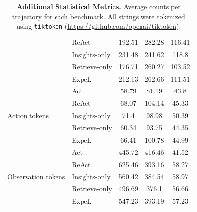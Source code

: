 \documentclass[letterpaper]{article} %
\begin{document}
\begin{table}[!ht]
\begin{tabular}{@{}llccc@{}}
		& ReAct & 192.51& 282.28& 116.41\\
		& Insights-only & 231.48& 241.62& 118.8\\
		& Retrieve-only & 176.71& 260.27& 103.52\\
		& ExpeL & 212.13& 262.66& 111.51\\
        \midrule
        \multirow{5}{*}{Action tokens} 
		& Act & 58.79& 81.19& 43.8\\
		& ReAct & 68.07& 104.14& 45.33\\
		& Insights-only & 71.4& 98.98& 50.39\\
		& Retrieve-only & 60.34& 93.75& 44.35\\
		& ExpeL & 66.41& 100.78& 44.99\\
        \midrule
        \multirow{5}{*}{Observation tokens} 
		& Act & 445.72& 416.46& 41.52\\
		& ReAct & 625.46& 393.16& 58.27\\
		& Insights-only & 560.42& 384.54& 58.97\\
		& Retrieve-only & 496.69& 376.1& 56.66\\
		& ExpeL & 547.23& 393.19& 57.23\\
        \midrule
    \end{tabular}
    \bigskip
    \caption{\textbf{Additional Statistical Metrics.} Average counts per trajectory for each benchmark. All strings were tokenized using \texttt{tiktoken} (\url{https://github.com/openai/tiktoken}).}
    \label{tab:add-results}
\end{table}
\end{document}
